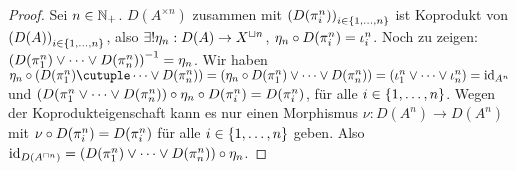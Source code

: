 \documentclass{book}
\begin{document}
\begin{proof}
    Sei $n\in\mathbb{N}_+$. $D(A^{\times n})$ zusammen mit ${(D(\pi^n_i))}_{i\in\left\{1,\ldots,n\right\}}$ ist Koprodukt von ${(D(A))}_{i\in\left\{1,\ldots,n\right\}}$, also $\exists !\eta_n: D(A)\rightarrow X^{\mathbin{\sqcup} n}$, $\eta_n\circ D(\pi^n_i)=\iota_i^n$.
    Noch zu zeigen: ${(D(\pi^n_1)\vee\cdots\vee D(\pi^n_n))}^{-1}=\eta_n$. Wir haben $\eta_n\compose(D(\pi^n_1)\cutuple\cdots\cotuple D(\pi^n_n))=(\eta_n\compose D(\pi^n_1)\cotuple\cdots\cotuple D(\pi^n_n))=(\iota^n_1\cotuple\cdots\cotuple\iota^n_n)=\id_{A^n}$ und $(D(\pi^n_1\vee\cdots\vee D(\pi^n_n))\circ\eta_n\circ D(\pi^n_i)=D(\pi^n_i)$, für alle $i\in\left\{1,\ldots,n\right\}$. Wegen der Koprodukteigenschaft kann es nur einen Morphismus $\nu:D(A^n)\to D(A^n)$ mit $\nu\circ D(\pi^n_i)=D(\pi^n_i)$ für alle $i\in\left\{1,\ldots,n\right\}$ geben. Also $\mathop\mathrm{id}\nolimits_{D(A^{\mathbin{\sqcap} n})}=(D(\pi^n_1)\vee\cdots\vee D(\pi^n_n))\circ\eta_n$. 
\end{proof}
\end{document}
